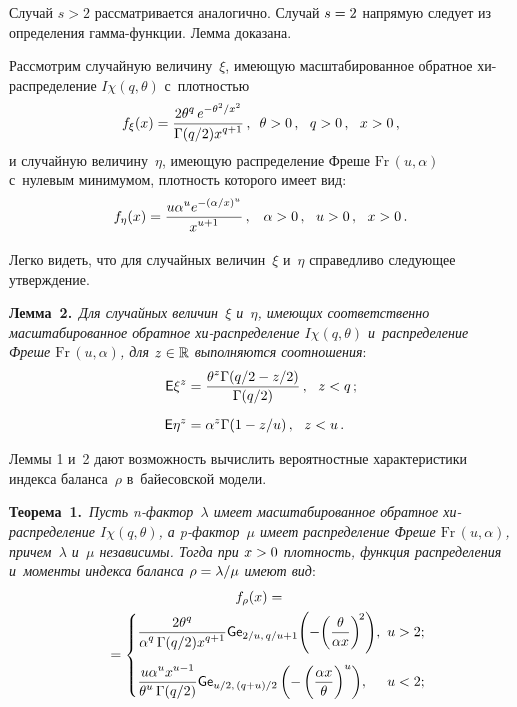 \begin{multicols}{2}
Случай $s>2$ рассматривается аналогично. Случай $s\hm=2$ напрямую следует из 
определения гам\-ма-функ\-ции.
Лемма доказана.

\smallskip

Рассмотрим случайную величину~$\xi$, име\-ющую масштабированное обратное 
хи-рас\-пре\-де\-ле\-ние $I\chi(q,\theta)$ с~плот\-ностью
$$
f_\xi(x)=\displaystyle\frac{\displaystyle 2\theta^{q}\, e^{-\theta^2/x^2}\mathstrut}{\displaystyle \Gamma({q}/{2})x^{q +1}\mathstrut}\,,\enskip 
\theta>0\,,\ \ q>0\,,\ \ x>0\,,
$$
и случайную величину~$\eta$, имеющую распределение Фреше $\mathrm{Fr}\,(u,\alpha)$~\cite{Frechet1927} 
с~нулевым минимумом, плотность которого имеет вид:
$$
f_\eta(x)=\fr{u \alpha^{u}e^{-(\alpha/x)^u}}{x^{u +1}}\,,\enskip \ \alpha>0\,, \ \ 
u>0\,,\ \ x>0\,.
$$

Легко видеть, что для случайных величин~$\xi$ и~$\eta$ справедливо следующее 
утверждение.

\smallskip

\noindent
\textbf{Лемма~2.}\
\textit{Для случайных величин~$\xi$ и~$\eta$, имеющих соответственно масштабированное 
обратное хи-рас\-пре\-де\-ле\-ние $I\chi(q,\theta)$ и~распределение Фреше 
$\mathrm{Fr}\,(u,\alpha)$, для $z\hm\in\mathbb{R}$ выполняются соотношения}:
\begin{align*}
{\sf E}\xi^z&=\displaystyle\frac{\displaystyle \theta^{z} \Gamma(q/2-z/2)\mathstrut}{\displaystyle \Gamma(q/2)\mathstrut}\,,\ \  z<q\,;\\[6pt]
{\sf E}\eta^z&={\alpha^{z} \Gamma(1-z/u)}\,,\ \ z<u\,.
\end{align*}


\smallskip

Леммы 1 и~2 дают возможность вычислить вероятностные характеристики индекса 
баланса~$\rho$ в~байесовской модели.

\smallskip

\noindent
\textbf{Теорема~1.}\
\textit{Пусть n-фак\-тор~$\lambda$ имеет масштабированное обратное хи-рас\-пре\-де\-ле\-ние 
$I\chi(q, \theta)$, а p-фак\-тор~$\mu$ имеет распределение Фреше $\mathrm{Fr}\,(u,\alpha)$, 
причем~$\lambda$ и~$\mu$ независимы. Тогда при $x\hm>0$ плотность, функция 
распределения и~моменты индекса баланса $\rho\hm=\lambda/\mu$ имеют вид}:
\begin{multline*}%
f_\rho(x) ={}\\
{}=
 \begin{cases}
   \displaystyle \fr{2\theta^{q}}{\alpha^{q}\,\Gamma(q/2)x^{q+1}}{\sf Ge}_{2/u,\, 
q/u+1}\!\left(-\!\left(\fr{\theta}{\alpha x}\right)^{\!2}\right)\!,& \!\!\! u>2;\hspace*{-8pt}\\[16pt]
   \displaystyle \fr{u\alpha^{u}x^{u-1}}{\theta^{u}\,\Gamma(q/2)}{\sf Ge}_{u/2,\, 
(q+u)/2}\left(-\left(\fr{\alpha x}{\theta}\right)^{u}\right)\!, 
& \!\!\!u<2;\hspace*{-8pt}%
\\
 \end{cases}
\end{multline*}


\end{multicols}
